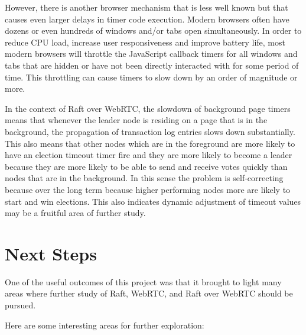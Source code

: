 \documentclass{acmtog} %
\begin{document}
However, there is another browser mechanism that is less well known
but that causes even larger delays in timer code execution. Modern
browsers often have dozens or even hundreds of windows and/or tabs
open simultaneously. In order to reduce CPU load, increase user
responsiveness and improve battery life, most modern browsers will
throttle the JavaScript callback timers for all windows and tabs that
are hidden or have not been directly interacted with for some period
of time. This throttling can cause timers to slow down by an order of
magnitude or more.

In the context of Raft over WebRTC, the slowdown of background page
timers means that whenever the leader node is residing on a page that
is in the background, the propagation of transaction log entries slows
down substantially. This also means that other nodes which are in the
foreground are more likely to have an election timeout timer fire and
they are more likely to become a leader because they are more likely
to be able to send and receive votes quickly than nodes that are in
the background. In this sense the problem is self-correcting because
over the long term because higher performing nodes more are likely to
start and win elections. This also indicates dynamic adjustment of
timeout values may be a fruitful area of further study.

\section{Next Steps}

One of the useful outcomes of this project was that it brought to
light many areas where further study of Raft, WebRTC, and Raft over
WebRTC should be pursued.

Here are some interesting areas for further exploration:
\end{document}
